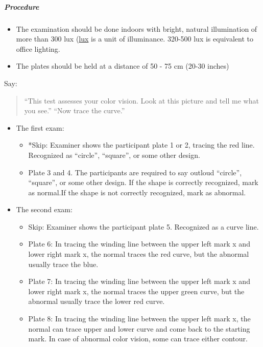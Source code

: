 \documentclass[]{article}
\providecommand{\tightlist}{%
  \setlength{\itemsep}{0pt}\setlength{\parskip}{0pt}}
\let\oldsubparagraph\subparagraph
\renewcommand{\subparagraph}[1]{\oldsubparagraph{#1}\mbox{}}
\begin{document}
\subparagraph{Procedure}\label{procedure-1}

\begin{itemize}
\tightlist
\item
  The examination should be done indoors with bright, natural
  illumination of more than 300 lux
  (\href{https://en.wikipedia.org/wiki/Lux}{lux} is a unit of
  illuminance. 320-500 lux is equivalent to office lighting.
\item
  The plates should be held at a distance of 50 - 75 cm (20-30 inches)
\end{itemize}

Say:

\begin{quote}
``This test assesses your color vision. Look at this picture and tell me
what you see.'' ``Now trace the curve.''
\end{quote}

\begin{itemize}
\tightlist
\item
  The first exam:

  \begin{itemize}
  \tightlist
  \item
    *Skip: Examiner shows the participant plate 1 or 2, tracing the red
    line. Recognized as ``circle'', ``square'', or some other design.
  \item
    Plate 3 and 4. The participants are required to say outloud
    ``circle'', ``square'', or some other design. If the shape is
    correctly recognized, mark as normal.If the shape is not correctly
    recognized, mark as abnormal.
  \end{itemize}
\item
  The second exam:

  \begin{itemize}
  \tightlist
  \item
    Skip: Examiner shows the participant plate 5. Recognized as a curve
    line.
  \item
    Plate 6: In tracing the winding line between the upper left mark x
    and lower right mark x, the normal traces the red curve, but the
    abnormal usually trace the blue.
  \item
    Plate 7: In tracing the winding line between the upper left mark x
    and lower right mark x, the normal traces the upper green curve, but
    the abnormal usually trace the lower red curve.
  \item
    Plate 8: In tracing the winding line between the upper left mark x,
    the normal can trace upper and lower curve and come back to the
    starting mark. In case of abnormal color vision, some can trace
    either contour.
  \end{itemize}
\end{itemize}
\end{document}
